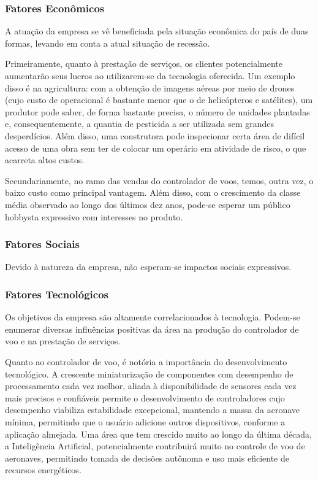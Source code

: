 \subsubsection*{Fatores Econômicos}

A atuação da empresa se vê beneficiada pela situação econômica do país de duas formas, levando em 
conta a atual situação de recessão. 

Primeiramente, quanto à prestação de serviços, os clientes potencialmente aumentarão seus lucros 
ao utilizarem-se da tecnologia oferecida. Um exemplo disso é na agricultura: com a obtenção de 
imagens aéreas por meio de drones (cujo custo de operacional é bastante menor que o de helicópteros 
e satélites), um produtor pode saber, de forma bastante precisa, o número de unidades plantadas e, 
consequentemente, a quantia de pesticida a ser utilizada sem grandes desperdícios. Além disso, uma 
construtora pode inspecionar certa área de difícil acesso de uma obra sem ter de colocar um operário 
em atividade de risco, o que acarreta altos custos.

Secundariamente, no ramo das vendas do controlador de voos, temos, outra vez, o baixo custo como 
principal vantagem. Além disso, com o crescimento da classe média observado ao longo dos últimos 
dez anos, pode-se esperar um público hobbysta expressivo com interesses no produto.

\subsubsection*{Fatores Sociais}

Devido à natureza da empresa, não esperam-se impactos sociais expressivos.

\subsubsection*{Fatores Tecnológicos}
	
Os objetivos da empresa são altamente correlacionados à tecnologia. Podem-se enumerar diversas influências 
positivas da área na produção do controlador de voo e na prestação de serviços. 

Quanto ao controlador de voo, é notória a importância do desenvolvimento tecnológico. A crescente 
miniaturização de componentes com desempenho de processamento cada vez melhor, aliada à disponibilidade 
de sensores cada vez mais precisos e confiáveis permite o desenvolvimento de controladores cujo desempenho 
viabiliza estabilidade excepcional, mantendo a massa da aeronave mínima, permitindo que o usuário adicione 
outros dispositivos, conforme a aplicação almejada. Uma área que tem crescido muito ao longo da última década, 
a Inteligência Artificial, potencialmente contribuirá muito no controle de voo de aeronaves, permitindo 
tomada de decisões autônoma e uso mais eficiente de recursos energéticos.

